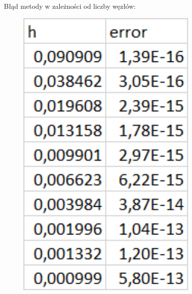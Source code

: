 \newpage

\begin{samepage}
    Błąd metody w zależności od liczby węzłów:
    \begin{figure}[!ht]
        \begin{center}
            \includegraphics[width=0.8\textwidth]{Lab4/charts/zad3/error_dane.png}
        \end{center}
    \end{figure}
    \FloatBarrier
\end{samepage} 

